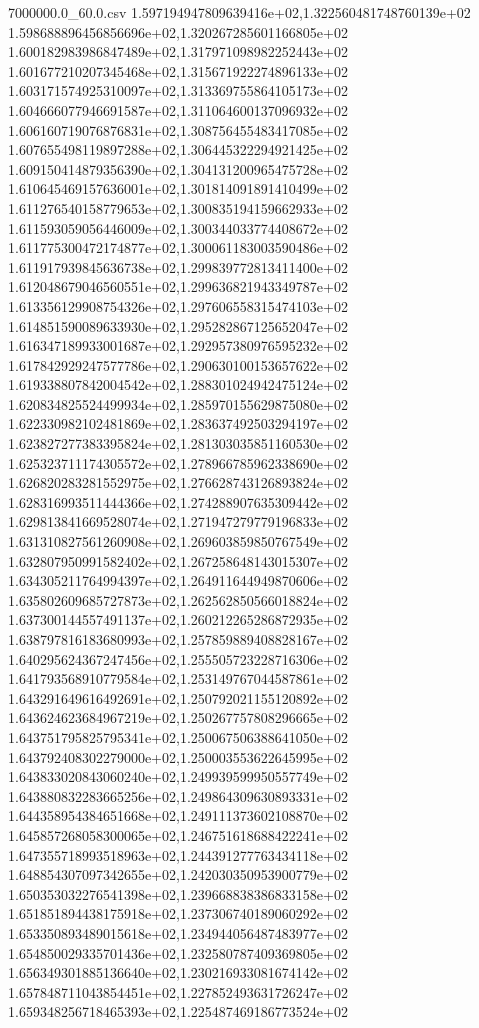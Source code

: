 \begin{filecontents*}{7000000.0_60.0.csv}
1.597194947809639416e+02,1.322560481748760139e+02
1.598688896456856696e+02,1.320267285601166805e+02
1.600182983986847489e+02,1.317971098982252443e+02
1.601677210207345468e+02,1.315671922274896133e+02
1.603171574925310097e+02,1.313369755864105173e+02
1.604666077946691587e+02,1.311064600137096932e+02
1.606160719076876831e+02,1.308756455483417085e+02
1.607655498119897288e+02,1.306445322294921425e+02
1.609150414879356390e+02,1.304131200965475728e+02
1.610645469157636001e+02,1.301814091891410499e+02
1.611276540158779653e+02,1.300835194159662933e+02
1.611593059056446009e+02,1.300344033774408672e+02
1.611775300472174877e+02,1.300061183003590486e+02
1.611917939845636738e+02,1.299839772813411400e+02
1.612048679046560551e+02,1.299636821943349787e+02
1.613356129908754326e+02,1.297606558315474103e+02
1.614851590089633930e+02,1.295282867125652047e+02
1.616347189933001687e+02,1.292957380976595232e+02
1.617842929247577786e+02,1.290630100153657622e+02
1.619338807842004542e+02,1.288301024942475124e+02
1.620834825524499934e+02,1.285970155629875080e+02
1.622330982102481869e+02,1.283637492503294197e+02
1.623827277383395824e+02,1.281303035851160530e+02
1.625323711174305572e+02,1.278966785962338690e+02
1.626820283281552975e+02,1.276628743126893824e+02
1.628316993511444366e+02,1.274288907635309442e+02
1.629813841669528074e+02,1.271947279779196833e+02
1.631310827561260908e+02,1.269603859850767549e+02
1.632807950991582402e+02,1.267258648143015307e+02
1.634305211764994397e+02,1.264911644949870606e+02
1.635802609685727873e+02,1.262562850566018824e+02
1.637300144557491137e+02,1.260212265286872935e+02
1.638797816183680993e+02,1.257859889408828167e+02
1.640295624367247456e+02,1.255505723228716306e+02
1.641793568910779584e+02,1.253149767044587861e+02
1.643291649616492691e+02,1.250792021155120892e+02
1.643624623684967219e+02,1.250267757808296665e+02
1.643751795825795341e+02,1.250067506388641050e+02
1.643792408302279000e+02,1.250003553622645995e+02
1.643833020843060240e+02,1.249939599950557749e+02
1.643880832283665256e+02,1.249864309630893331e+02
1.644358954384651668e+02,1.249111373602108870e+02
1.645857268058300065e+02,1.246751618688422241e+02
1.647355718993518963e+02,1.244391277763434118e+02
1.648854307097342655e+02,1.242030350953900779e+02
1.650353032276541398e+02,1.239668838386833158e+02
1.651851894438175918e+02,1.237306740189060292e+02
1.653350893489015618e+02,1.234944056487483977e+02
1.654850029335701436e+02,1.232580787409369805e+02
1.656349301885136640e+02,1.230216933081674142e+02
1.657848711043854451e+02,1.227852493631726247e+02
1.659348256718465393e+02,1.225487469186773524e+02

\end{filecontents*}
